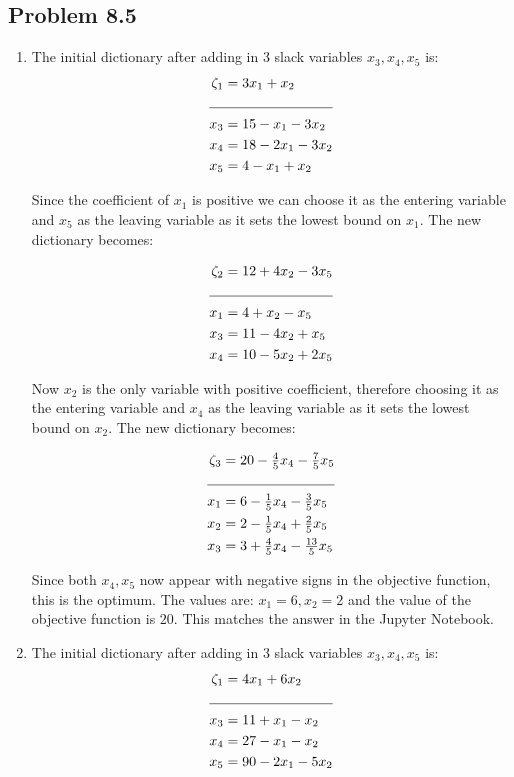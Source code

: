 \documentclass[letterpaper,12pt]{article}
\theoremstyle{definition}
\begin{document}
\subsection*{Problem 8.5 }
\begin{enumerate}
\item The initial dictionary after adding in 3 slack variables $x_3, x_4, x_5$ is:
  \begin{align*}
      \zeta_1 &= 3x_1+x_2\\
      \cline{1-2}
      x_3 &= 15 - x_1 - 3x_2\\
      x_4 &= 18-2x_1-3x_2\\
      x_5 &= 4-x_1+x_2
  \end{align*}

Since the coefficient of $x_1$ is positive we can choose  it as the entering variable and $x_5$ as the leaving variable as it sets the lowest bound on $x_1$. The new dictionary becomes:

\begin{align*}
    \zeta_2 &= 12+4x_2-3x_5\\
    \cline{1-2}
    x_1 &= 4 + x_2 - x_5\\
    x_3 &= 11-4x_2+ x_5\\
    x_4 &= 10-5x_2+2x_5\\
\end{align*}

Now $x_2$ is the only variable with positive coefficient, therefore choosing it as the entering variable and $x_4$ as the leaving variable as it sets the lowest bound on $x_2$. The new dictionary becomes:

\begin{align*}
    \zeta_3 &= 20 - \tfrac{4}{5}x_4 - \tfrac{7}{5}x_5\\
    \cline{1-2}
    x_1 &= 6 - \tfrac{1}{5}x_4 - \tfrac{3}{5}x_5\\
    x_2 &= 2-\tfrac{1}{5}x_4+ \tfrac{2}{5}x_5\\
    x_3 &= 3 + \tfrac{4}{5}x_4 -\tfrac{13}{5}x_5\\
\end{align*}

Since both $x_4, x_5$ now appear with negative signs in the objective function, this is the optimum. The
values are: $x_1= 6, x_2=2$ and the value of the objective function is $20$. This matches the answer in the
Jupyter Notebook.

\item The initial dictionary after adding in 3 slack variables $x_3, x_4, x_5$ is:
\begin{align*}
      \zeta_1 &= 4x_1+6x_2\\
      \cline{1-2}
      x_3 &= 11 + x_1 - x_2\\
      x_4 &= 27-x_1-x_2\\
      x_5 &= 90 - 2x_1 - 5x_2\\
\end{align*}


\end{enumerate}
\end{document}
